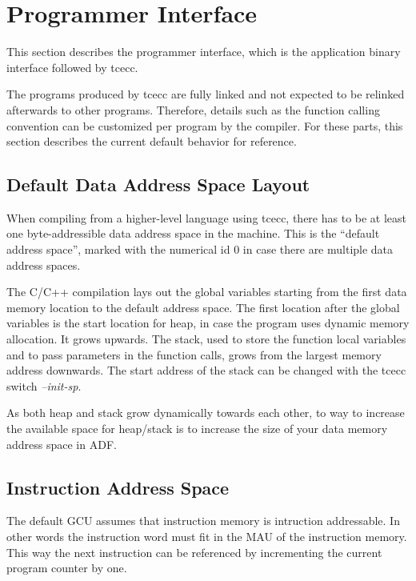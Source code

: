\documentclass[twoside]{tceusermanual}
\begin{document}
\section{Programmer Interface}

This section describes the programmer interface, which is 
the application binary interface followed by tcecc.

The programs produced by tcecc are fully linked and not expected
to be relinked afterwards to other programs. Therefore, details 
such as the function calling convention can be customized per program by 
the compiler. For these parts, this section describes the current 
default behavior for reference.

\subsection{Default Data Address Space Layout}
\label{ssec:address-spaces-of-umach}

When compiling from a higher-level language using tcecc, there 
has to be at least one byte-addressible data address space in the machine. 
This is the ``default address space'', marked with the numerical 
id 0 in case there are multiple data address spaces. 

The C/C++ compilation lays out the global variables starting from the 
first data memory location to the default address space. The first 
location after the global variables is the start location for heap, 
in case the program uses dynamic memory allocation. It grows upwards. 
The stack, used to store the function local variables and to pass 
parameters in the function calls, grows from the largest memory address 
downwards. The start address of the stack can be changed with the tcecc 
switch \textit{{--}init-sp}.

As both heap and stack grow dynamically towards each other, to way to
increase the available space for heap/stack is to 
increase the size of your data memory address space in ADF. 

\subsection{Instruction Address Space}

The default GCU assumes that instruction memory is intruction addressable. In
other words the instruction word must fit in the MAU of the instruction
memory. This way the next instruction can be referenced by incrementing the
current program counter by one.
\end{document}
